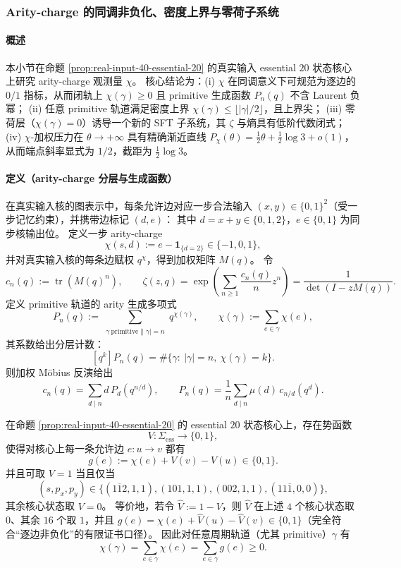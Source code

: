 \subsubsection{Arity-charge 的同调非负化、密度上界与零荷子系统}\label{app:real-input-40-arity-charge}
\paragraph{概述}
本小节在命题 \ref{prop:real-input-40-essential-20} 的真实输入 essential $20$ 状态核心上研究 arity-charge 观测量 $\chi$。
核心结论为：(\textup{i}) $\chi$ 在同调意义下可规范为逐边的 $0/1$ 指标，从而闭轨上 $\chi(\gamma)\ge 0$ 且 primitive 生成函数 $P_n(q)$ 不含 Laurent 负幂；
(\textup{ii}) 任意 primitive 轨道满足密度上界 $\chi(\gamma)\le \lfloor|\gamma|/2\rfloor$，且上界尖；
(\textup{iii}) 零荷层（$\chi(\gamma)=0$）诱导一个新的 SFT 子系统，其 $\zeta$ 与熵具有低阶代数闭式；
(\textup{iv}) $\chi$-加权压力在 $\theta\to+\infty$ 具有精确渐近直线 $P_\chi(\theta)=\frac12\theta+\frac12\log 3+o(1)$，从而端点斜率显式为 $1/2$，截距为 $\frac12\log 3$。

\paragraph{定义（arity-charge 分层与生成函数）}
在真实输入核的图表示中，每条允许边对应一步合法输入 $(x,y)\in\{0,1\}^2$（受一步记忆约束），并携带边标记 $(d,e)$：
其中 $d=x+y\in\{0,1,2\}$，$e\in\{0,1\}$ 为同步核输出位。
定义一步 arity-charge
\[
\chi(s,d):=e-\mathbf{1}_{\{d=2\}}\in\{-1,0,1\},
\]
并对真实输入核的每条边赋权 $q^{\chi}$，得到加权矩阵 $M(q)$。
令
\[
c_n(q):=\operatorname{tr}(M(q)^n),
\qquad
\zeta(z,q)=\exp\!\left(\sum_{n\ge 1}\frac{c_n(q)}{n}z^n\right)
=\frac{1}{\det(I-zM(q))}.
\]
定义 primitive 轨道的 arity 生成多项式
\[
P_n(q):=\sum_{\substack{\gamma\ \mathrm{primitive}\|\gamma|=n}} q^{\chi(\gamma)},
\qquad
\chi(\gamma):=\sum_{e\in\gamma}\chi(e),
\]
其系数给出分层计数：
\[
[q^k]P_n(q)=\#\{\gamma:\ |\gamma|=n,\ \chi(\gamma)=k\}.
\]
则加权 Möbius 反演给出
\[
c_n(q)=\sum_{d\mid n} d\,P_d\!\left(q^{n/d}\right),
\qquad
P_n(q)=\frac{1}{n}\sum_{d\mid n}\mu(d)\,c_{n/d}\!\left(q^{d}\right).
\]

\begin{theorem}\label{thm:real-input-40-arity-charge-coboundary}
在命题 \ref{prop:real-input-40-essential-20} 的 essential $20$ 状态核心上，存在势函数
\[
V:\Sigma_{\mathrm{ess}}\to\{0,1\},
\]
使得对核心上每一条允许边 $e:u\to v$ 都有
\[
g(e):=\chi(e)+V(v)-V(u)\in\{0,1\}.
\]
并且可取 $V=1$ 当且仅当
\[
(s,p_x,p_y)\in\{(1\overline{1}2,1,1),(101,1,1),(002,1,1),(11\overline{1},0,0)\},
\]
其余核心状态取 $V=0$。
等价地，若令 $\widehat V:=1-V$，则 $\widehat V$ 在上述 $4$ 个核心状态取 $0$、其余 $16$ 个取 $1$，并且
\(
g(e)=\chi(e)+\widehat V(u)-\widehat V(v)\in\{0,1\}
\)（完全符合“逐边非负化”的有限证书口径）。
因此对任意周期轨道（尤其 primitive）$\gamma$ 有
\[
\chi(\gamma)=\sum_{e\in\gamma}\chi(e)=\sum_{e\in\gamma}g(e)\ge 0.
\]
\end{theorem}

